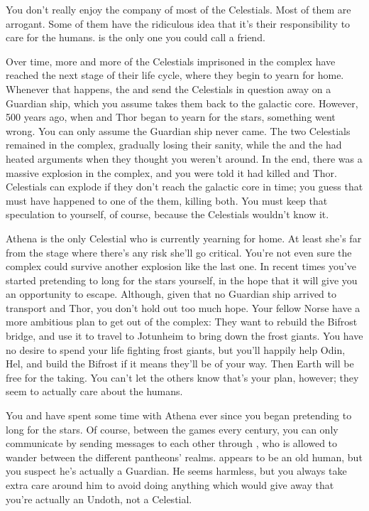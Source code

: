 \documentclass[char]{guardians}
\begin{document}
You don't really enjoy the company of most of the Celestials. Most of them are arrogant. Some of them have the ridiculous idea that it's their responsibility to care for the humans. \cAnubis{} is the only one you could call a friend.

Over time, more and more of the Celestials imprisoned in the complex have reached the next stage of their life cycle, where they begin to yearn for home. Whenever that happens, the \cWarden{} and \cCaretaker{} send the Celestials in question away on a Guardian ship, which you assume takes them back to the galactic core. However, 500 years ago, when \cSet{} and Thor began to yearn for the stars, something went wrong. You can only assume the Guardian ship never came. The two Celestials remained in the complex, gradually losing their sanity, while the \cWarden{} and the \cCaretaker{} had heated arguments when they thought you weren't around. In the end, there was a massive explosion in the complex, and you were told it had killed \cSet{} and Thor. Celestials can explode if they don't reach the galactic core in time; you guess that must have happened to one of the them, killing both. You must keep that speculation to yourself, of course, because the Celestials wouldn't know it.

Athena is the only Celestial who is currently yearning for home. At least she's far from the stage where there's any risk she'll go critical. You're not even sure the complex could survive another explosion like the last one. In recent times you've started pretending to long for the stars yourself, in the hope that it will give you an opportunity to escape. Although, given that no Guardian ship arrived to transport \cSet{} and Thor, you don't hold out too much hope. Your fellow Norse have a more ambitious plan to get out of the complex: They want to rebuild the Bifrost bridge, and use it to travel to Jotunheim to bring down the frost giants. You have no desire to spend your life fighting frost giants, but you'll happily help Odin, Hel, and \cVal{} build the Bifrost if it means they'll be of your way. Then Earth will be free for the taking. You can't let the others know that's your plan, however; they seem to actually care about the humans.

You and \cVal{} have spent some time with Athena ever since you began pretending to long for the stars. Of course, between the games every century, you can only communicate by sending messages to each other through \cJascha{}, who is allowed to wander between the different pantheons' realms. \cJascha{} appears to be an old human, but you suspect he's actually a Guardian. He seems harmless, but you always take extra care around him to avoid doing anything which would give away that you're actually an Undoth, not a Celestial.
\end{document}
